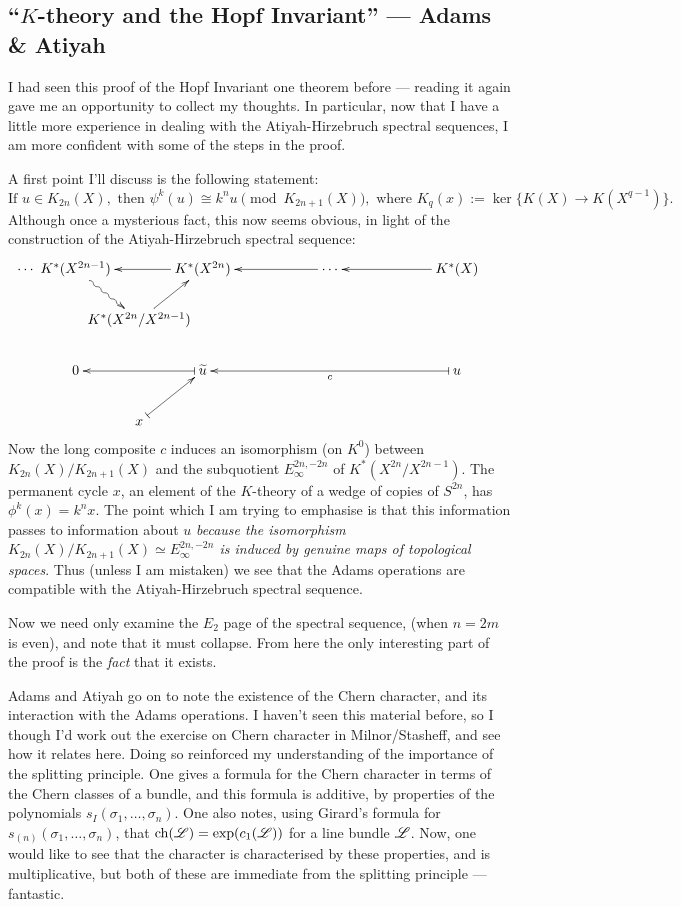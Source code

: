 \documentclass[11pt]{article}
\newcommand{\KanSemResponse}[1]
{
\thispagestyle{fancy}
\section{#1}
}
\begin{document}
\begin{HopfInvOne}
\KanSemResponse
{``$K$-theory and the Hopf Invariant'' --- Adams \& Atiyah}
I had seen this proof of the Hopf Invariant one theorem before --- reading it again gave me an opportunity to collect my thoughts. In particular, now that I have a little more experience in dealing with the Atiyah-Hirzebruch spectral sequences, I am more confident with some of the steps in the proof.

A first point I'll discuss is the following statement:
\[\text{If }u\in K_{2n}(X),\text{ then }\psi^k(u)\cong k^nu\pmod{K_{2n+1}(X)},\text{ where $K_q(x):=\ker\{K(X)\to K(X^{q-1})\}$.}\]
Although once a mysterious fact, this now seems obvious, in light of the construction of the Atiyah-Hirzebruch spectral sequence:
\[\xymatrix@!0@C=1.6cm@R=1.28cm{%
\makebox[0cm][r]{$\cdots$\ }
K^*(X^{2n-1})\ar[rr];[]&&
K^*(X^{2n})\ar[rr];[]\ar[ld];[]&&
\cdots\ar[rr];[]&&
K^*(X)\\
&K^*(X^{2n}/X^{2n-1})\ar@{~>}[ul];[]&&\\
0\ar@{|->}[rr];[]&&\widetilde u\ar@{|->}[rrrr];[]^c\ar@{|->}[ld];[]&&&&u\\
&x
}\]
Now the long composite $c$ induces an isomorphism (on $K^0$) between $K_{2n}(X)/K_{2n+1}(X)$ and the subquotient $E_\infty^{2n,-2n}$ of $K^*(X^{2n}/X^{2n-1})$. The permanent cycle $x$, an element of the $K$-theory of a wedge of copies of $S^{2n}$, has $\phi^{k}(x)=k^nx$. The point which I am trying to emphasise is that this information passes to information about $u$ \emph{because the isomorphism $K_{2n}(X)/K_{2n+1}(X)\simeq E_\infty^{2n,-2n}$ is induced by genuine maps of topological spaces}. Thus (unless I am mistaken) we see that the Adams operations are compatible with the Atiyah-Hirzebruch spectral sequence.

Now we need only examine the $E_2$ page of the spectral sequence, (when $n=2m$ is even), and note that it must collapse. From here the only interesting part of the proof is the \emph{fact} that it exists.

Adams and Atiyah go on to note the existence of the Chern character, and its interaction with the Adams operations. I haven't seen this material before, so I though I'd work out the exercise on Chern character in Milnor/Stasheff, and see how it relates here. Doing so reinforced my understanding of the importance of the splitting principle. One gives a formula for the Chern character in terms of the Chern classes of a bundle, and this formula is additive, by properties of the polynomials $s_I(\sigma_1,\ldots,\sigma_n)$. One also notes, using Girard's formula for $s_{(n)}(\sigma_1,\ldots,\sigma_n)$, that $\operatorname{ch}(\mathscr{L})=\exp(c_1(\mathscr{L}))$ for a line bundle $\mathscr{L}$. Now, one would like to see that the character is characterised by these properties, and is multiplicative, but both of these are immediate from the splitting principle --- fantastic.


\end{HopfInvOne}
\end{document}
